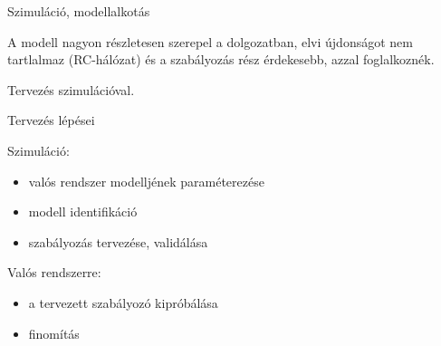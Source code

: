 \documentclass[14pt,handout]{beamer}
\begin{document}
\begin{frame}{Szimuláció, modellalkotás}

A modell nagyon részletesen szerepel a dolgozatban, elvi újdonságot nem tartlalmaz (RC-hálózat) és a szabályozás rész érdekesebb, azzal foglalkoznék.

Tervezés szimulációval.



\end{frame}

\begin{frame}{Tervezés lépései}

Szimuláció:
\begin{itemize}
	\item valós rendszer modelljének paraméterezése
	\item modell identifikáció
	\item szabályozás tervezése, validálása
\end{itemize}
\vspace{6pt}

Valós rendszerre:
\begin{itemize}
	\item a tervezett szabályozó kipróbálása
	\item finomítás
\end{itemize}


\end{frame}
\end{document}
